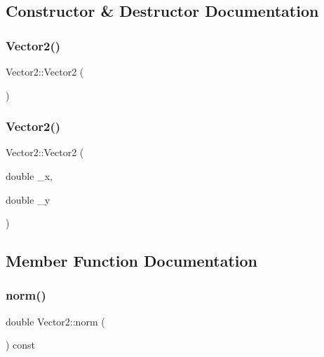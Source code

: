 \subsection{Constructor \& Destructor Documentation}
\mbox{\label{classVector2_a22104d1809be26a419ef1f959e3761bf}} 
\subsubsection{\texorpdfstring{Vector2()}{Vector2()}\hspace{0.1cm}{\footnotesize\ttfamily [1/2]}}
{\footnotesize\ttfamily Vector2\+::\+Vector2 (\begin{DoxyParamCaption}{ }\end{DoxyParamCaption})\hspace{0.3cm}{\ttfamily [inline]}}

\mbox{\label{classVector2_a861062b13bd0e92d50b3ffd90c9edd77}} 
\subsubsection{\texorpdfstring{Vector2()}{Vector2()}\hspace{0.1cm}{\footnotesize\ttfamily [2/2]}}
{\footnotesize\ttfamily Vector2\+::\+Vector2 (\begin{DoxyParamCaption}\item[{double}]{\+\_\+x,  }\item[{double}]{\+\_\+y }\end{DoxyParamCaption})\hspace{0.3cm}{\ttfamily [inline]}}



\subsection{Member Function Documentation}
\mbox{\label{classVector2_aa237ac7d74130707d189c3740bc34f94}} 
\subsubsection{\texorpdfstring{norm()}{norm()}}
{\footnotesize\ttfamily double Vector2\+::norm (\begin{DoxyParamCaption}{ }\end{DoxyParamCaption}) const\hspace{0.3cm}{\ttfamily [inline]}}

